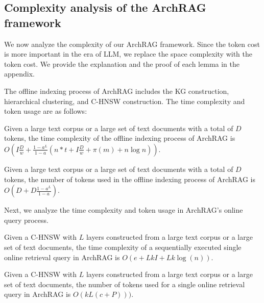 
\subsection{Complexity analysis of the ArchRAG framework}

We now analyze the complexity of our ArchRAG framework.
% 
Since the token cost is more important in the era of LLM, we replace the space complexity with the token cost.
We provide the explanation and the proof of each lemma in the appendix.

The offline indexing process of ArchRAG includes the KG construction, hierarchical clustering, and C-HNSW construction.
% 
The time complexity and token usage are as follows:

\begin{lemma}
\label{lemma:index-time}
Given a large text corpus or a large set of text documents with a total of $D$ tokens, the time complexity of the offline indexing process of ArchRAG is $O(I\frac{D}{w} + \frac{1-a^L}{1-a}(n*t+I\frac{D}{w}+\pi(m)+n\log n))$.
\end{lemma}

\begin{lemma}
\label{lemma:index-cost}
Given a large text corpus or a large set of text documents with a total of $D$ tokens, the number of tokens used in the offline indexing process of ArchRAG is $O(D + D\frac{1-a^L}{1-a})$.
\end{lemma}



Next, we analyze the time complexity and token usage in ArchRAG's online query process.

\begin{lemma}
\label{lemma:query-time}
Given a C-HNSW with $L$ layers constructed from a large text corpus or a large set of text documents, the time complexity of a sequentially executed single online retrieval query in ArchRAG is $O(e+ LkI+Lk\log(n))$.
\end{lemma}

\begin{lemma}
\label{lemma:query-cost}
Given a C-HNSW with $L$ layers constructed from a large text corpus or a large set of text documents, the number of tokens used for a single online retrieval query in ArchRAG is $O(kL(c+P)))$.
\end{lemma}

